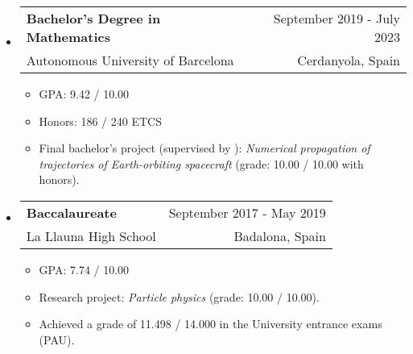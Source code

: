 \documentclass[a4paper,11pt]{article}
\makeatletter
\newcommand{\resumeQuadHeading}[4]{
  \item
  \begin{tabular*}{0.96\textwidth}[t]{l@{\extracolsep{\fill}}r}
    \textbf{#1} & \small #2 \\
    \small#3 & \small #4 \\
  \end{tabular*}
}
\newcommand{\resumeHeadingListStart}{
  \begin{itemize}[leftmargin=0.15in, label={}]
}
\newcommand{\resumeHeadingListEnd}{\end{itemize}}
\makeatother
\begin{document}
\resumeHeadingListStart{}
\resumeQuadHeading{Bachelor's Degree in Mathematics}{September 2019 - July 2023}
{Autonomous University of Barcelona}{Cerdanyola, Spain}
\begin{itemize}[leftmargin=3em, itemsep=0.1em, topsep=2pt]
  \item \small GPA: 9.42 / 10.00
  \item \small Honors: 186 / 240 ETCS
  \item \small Final bachelor's project (supervised by \href{http://www.gsd.uab.es/people?controller=member&view=member&id=9&slug=josep-maria}{}): \textit{Numerical propagation of trajectories of Earth-orbiting spacecraft} (grade: 10.00 / 10.00 with honors).
\end{itemize}
\resumeHeadingListEnd{}

\resumeHeadingListStart{}
\resumeQuadHeading{Baccalaureate}{September 2017 - May 2019}
{La Llauna High School}{Badalona, Spain}
\begin{itemize}[leftmargin=3em, itemsep=0.1em, topsep=2pt]
  \item \small GPA: 7.74 / 10.00
  \item \small Research project: \textit{Particle physics} (grade: 10.00 / 10.00).
  \item \small Achieved a grade of 11.498 / 14.000 in the University entrance exams (PAU).
\end{itemize}
\resumeHeadingListEnd{}


\end{document}

